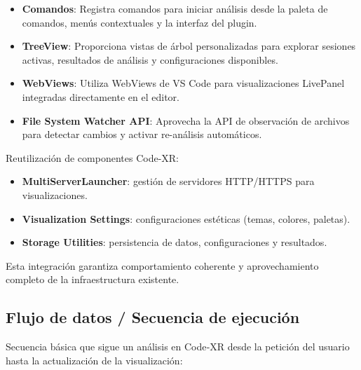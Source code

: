 \documentclass[a4paper, 12pt]{book}
\begin{document}
\begin{itemize}
  \item \textbf{Comandos}: Registra comandos para iniciar análisis desde la paleta de comandos, menús contextuales y la interfaz del plugin.
  
  \item \textbf{TreeView}: Proporciona vistas de árbol personalizadas para explorar sesiones activas, resultados de análisis y configuraciones disponibles.
  
  \item \textbf{WebViews}: Utiliza WebViews de VS Code para visualizaciones LivePanel integradas directamente en el editor.
  
  \item \textbf{File System Watcher API}: Aprovecha la API de observación de archivos para detectar cambios y activar re-análisis automáticos.
\end{itemize}

Reutilización de componentes Code-XR:

\begin{itemize}
  \item \textbf{MultiServerLauncher}: gestión de servidores HTTP/HTTPS para visualizaciones.
  \item \textbf{Visualization Settings}: configuraciones estéticas (temas, colores, paletas).
  \item \textbf{Storage Utilities}: persistencia de datos, configuraciones y resultados.
\end{itemize}

Esta integración garantiza comportamiento coherente y aprovechamiento completo de la infraestructura existente.

\subsection{Flujo de datos / Secuencia de ejecución}
\label{sec:flujo-ejecucion}

Secuencia básica que sigue un análisis en Code‑XR desde la petición del usuario hasta la actualización de la visualización:
\end{document}
